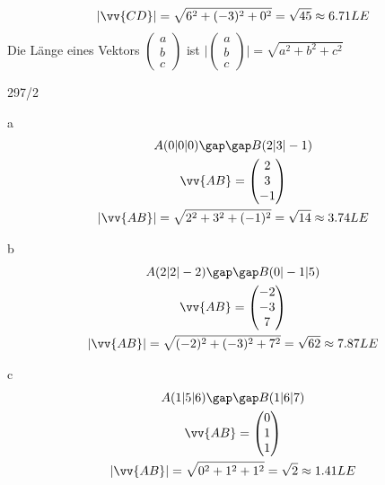 \begin{gather*}
  |\vv{CD}| = \sqrt{6^2 + (-3)^2 + 0^2} = \sqrt{45} \approx 6.71LE
\end{gather*}
Die Länge eines Vektors $\begin{pmatrix}a \\ b \\ c\end{pmatrix}$ ist $\Biggl|\begin{pmatrix}a \\ b \\ c\end{pmatrix}\Biggr| = \sqrt{a^2 + b^2 + c^2}$
\begin{exercise}{297/2}
  \item [a]
  \begin{gather*}
    A(0|0|0) \gap\gap B(2|3|-1) \\
    \vv{AB} = \begin{pmatrix}2 \\ 3 \\ -1\end{pmatrix} \\
    |\vv{AB}| = \sqrt{2^2 + 3^2 + (-1)^2} = \sqrt{14} \approx 3.74LE
  \end{gather*}
  \item [b]
  \begin{gather*}
    A(2|2|-2) \gap\gap B(0|-1|5) \\
    \vv{AB} = \begin{pmatrix}-2 \\ -3 \\ 7\end{pmatrix} \\
    |\vv{AB}| = \sqrt{(-2)^2 + (-3)^2 + 7^2} = \sqrt{62} \approx 7.87LE
  \end{gather*}
  \item [c]
  \begin{gather*}
    A(1|5|6) \gap\gap B(1|6|7) \\
    \vv{AB} = \begin{pmatrix}0 \\ 1 \\ 1\end{pmatrix} \\
    |\vv{AB}| = \sqrt{0^2 + 1^2 + 1^2} = \sqrt{2} \approx 1.41LE
  \end{gather*}
\end{exercise}
